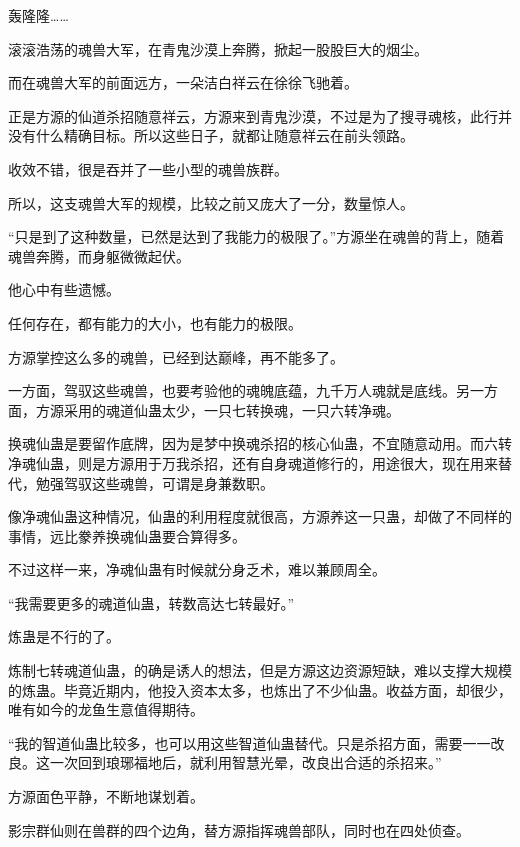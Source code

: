 
\begin{this_body}



轰隆隆……

滚滚浩荡的魂兽大军，在青鬼沙漠上奔腾，掀起一股股巨大的烟尘。

而在魂兽大军的前面远方，一朵洁白祥云在徐徐飞驰着。

正是方源的仙道杀招随意祥云，方源来到青鬼沙漠，不过是为了搜寻魂核，此行并没有什么精确目标。所以这些日子，就都让随意祥云在前头领路。

收效不错，很是吞并了一些小型的魂兽族群。

所以，这支魂兽大军的规模，比较之前又庞大了一分，数量惊人。

“只是到了这种数量，已然是达到了我能力的极限了。”方源坐在魂兽的背上，随着魂兽奔腾，而身躯微微起伏。

他心中有些遗憾。

任何存在，都有能力的大小，也有能力的极限。

方源掌控这么多的魂兽，已经到达巅峰，再不能多了。

一方面，驾驭这些魂兽，也要考验他的魂魄底蕴，九千万人魂就是底线。另一方面，方源采用的魂道仙蛊太少，一只七转换魂，一只六转净魂。

换魂仙蛊是要留作底牌，因为是梦中换魂杀招的核心仙蛊，不宜随意动用。而六转净魂仙蛊，则是方源用于万我杀招，还有自身魂道修行的，用途很大，现在用来替代，勉强驾驭这些魂兽，可谓是身兼数职。

像净魂仙蛊这种情况，仙蛊的利用程度就很高，方源养这一只蛊，却做了不同样的事情，远比豢养换魂仙蛊要合算得多。

不过这样一来，净魂仙蛊有时候就分身乏术，难以兼顾周全。

“我需要更多的魂道仙蛊，转数高达七转最好。”

炼蛊是不行的了。

炼制七转魂道仙蛊，的确是诱人的想法，但是方源这边资源短缺，难以支撑大规模的炼蛊。毕竟近期内，他投入资本太多，也炼出了不少仙蛊。收益方面，却很少，唯有如今的龙鱼生意值得期待。

“我的智道仙蛊比较多，也可以用这些智道仙蛊替代。只是杀招方面，需要一一改良。这一次回到琅琊福地后，就利用智慧光晕，改良出合适的杀招来。”

方源面色平静，不断地谋划着。

影宗群仙则在兽群的四个边角，替方源指挥魂兽部队，同时也在四处侦查。


\end{this_body}
